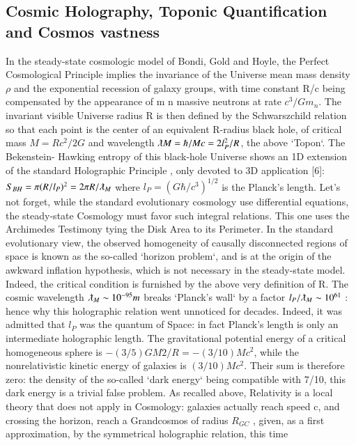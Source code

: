 \documentclass[twoside,draft]{article}
\begin{document}
{\subsection{Cosmic Holography, Toponic Quantification and Cosmos vastness}

In the steady-state cosmologic model of Bondi, Gold and Hoyle\cite{bondi}, the Perfect Cosmological
Principle implies the invariance of the Universe mean mass density $\rho$ and the exponential recession
of galaxy groups, with time constant R/c being compensated by the appearance of m n massive
neutrons at rate $c^{3} /Gm_{n}$. The invariant visible Universe radius R is then defined by the
Schwarszchild relation so that each point is the center of an equivalent R-radius black hole, of
critical mass $M = Rc^{2} /2G$ and wavelength $\lambdabar M = \hbar/Mc = 2l_{P}^{2} /R$, the above `Topon`. The Bekenstein-
Hawking entropy of this black-hole Universe shows an 1D extension of the standard Holographic
Principle , only devoted to 3D application \cite{bousso}[6]:
$S_{BH} = \pi(R/l_{P})^{2} = 2\pi R/\lambdabar_{M}$
where $l_{P} = (G\hbar/c^{3} )^{1/2}$ is the Planck's length. Let's not forget, while the standard evolutionary cosmology
use differential equations, the steady-state Cosmology must favor such integral relations. This one
uses the Archimedes Testimony tying the Disk Area to its Perimeter.
In the standard evolutionary view, the observed homogeneity of causally disconnected regions
of space is known as the so-called `horizon problem`, and is at the origin of the awkward inflation
hypothesis, which is not necessary in the steady-state model. Indeed, the critical condition is
furnished by the above very definition of R.
The cosmic wavelength $\lambdabar_{M} \sim 10^{-95} m$ breaks `Planck's wall` by a factor $l_{P} /\lambdabar_{M} \sim 10^{61}$ : hence why this holographic relation went unnoticed for decades. Indeed, it was admitted that $l_{P}$ was the quantum of Space: in fact Planck's length is only an intermediate holographic length.
The gravitational potential energy of a critical homogeneous sphere is $-(3/5)GM2/R = -
(3/10)Mc^{2}$, while the nonrelativistic kinetic energy of galaxies is $(3/10)Mc^{2}$. Their sum is therefore
zero: the density of the so-called `dark energy` being compatible with 7/10, this dark energy is a
trivial false problem. As recalled above, Relativity is a local theory that does not apply in
Cosmology: galaxies actually reach speed c, and crossing the horizon, reach a Grandcosmos of
radius $R_{GC}$ , given, as a first approximation, by the symmetrical holographic relation, this time
}
\end{document}
